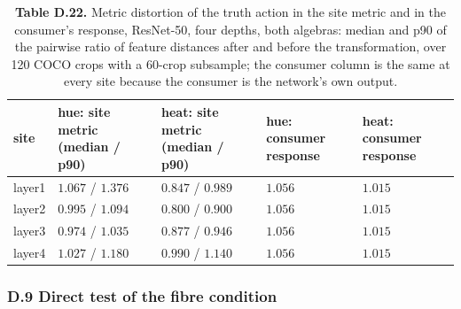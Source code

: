 \begin{table}[t]
\centering
\scriptsize
\caption*{\textbf{Table D.22.} Metric distortion of the truth action in the site metric and in the consumer's response, ResNet-50, four depths, both algebras: median and p90 of the pairwise ratio of feature distances after and before the transformation, over 120 COCO crops with a 60-crop subsample; the consumer column is the same at every site because the consumer is the network's own output.}
\setlength{\tabcolsep}{2pt}
\begin{tabularx}{\textwidth}{@{}>{\raggedright\arraybackslash}X >{\raggedright\arraybackslash}X >{\raggedright\arraybackslash}X >{\raggedright\arraybackslash}X >{\raggedright\arraybackslash}X@{}}
\toprule
\textbf{site} & \textbf{hue: site metric (median / p90)} & \textbf{heat: site metric (median / p90)} & \textbf{hue: consumer response} & \textbf{heat: consumer response} \\
\midrule
layer1 & $1.067$ / $1.376$ & $0.847$ / $0.989$ & $1.056$ & $1.015$ \\
layer2 & $0.995$ / $1.094$ & $0.800$ / $0.900$ & $1.056$ & $1.015$ \\
layer3 & $0.974$ / $1.035$ & $0.877$ / $0.946$ & $1.056$ & $1.015$ \\
layer4 & $1.027$ / $1.180$ & $0.990$ / $1.140$ & $1.056$ & $1.015$ \\
\bottomrule
\end{tabularx}
\end{table}

\subsubsection*{D.9 Direct test of the fibre condition}


